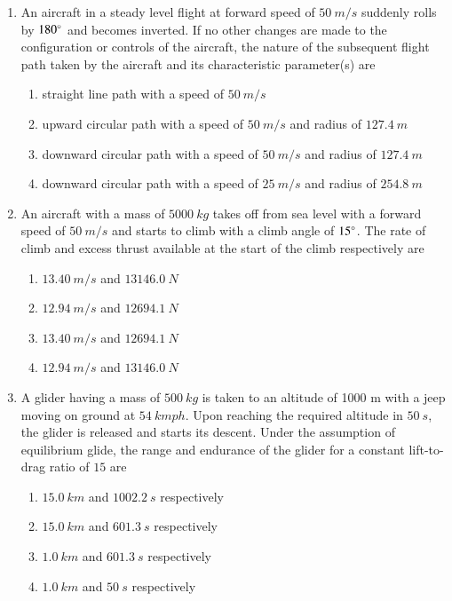 \documentclass{article}
\begin{document}
\begin{enumerate}
\item An aircraft in a steady level flight at forward speed of $50\ m/s$ suddenly rolls by $180\degree$ and becomes inverted. If no other changes are made to the configuration or controls of the aircraft, the nature of the subsequent flight path taken by the aircraft and its characteristic parameter(s) are
\begin{enumerate}
\item straight line path with a speed of $50\ m/s$
\item upward circular path with a speed of $50\ m/s$ and radius of $127.4\ m$
\item downward circular path with a speed of $50\ m/s$ and radius of $127.4\ m$
\item downward circular path with a speed of $25\ m/s$ and radius of $254.8\ m$
\end{enumerate}

\item An aircraft with a mass of $5000\ kg$ takes off from sea level with a forward speed of $50\ m/s$ and starts to climb with a climb angle of $15\degree$. The rate of climb and excess thrust available at the start of the climb respectively are
\begin{multicols}{2}
\begin{enumerate}
\item $13.40\ m/s$ and $13146.0\ N$
\item $12.94\ m/s$ and $12694.1\ N$
\item $13.40\ m/s$ and $12694.1\ N$
\item $12.94\ m/s$ and $13146.0\ N$
\end{enumerate}
\end{multicols}

\item A glider having a mass of $500\ kg$ is taken to an altitude of 1000 m with a jeep moving on ground at $54\ kmph$. Upon reaching the required altitude in $50\ s$, the glider is released and starts its descent. Under the assumption of equilibrium glide, the range and endurance of the glider for a constant lift-to-drag ratio of $15$ are
\begin{multicols}{2}
\begin{enumerate}
\item $15.0\ km$ and $1002.2\ s$ respectively
\item $15.0\ km$ and $601.3\ s$ respectively
\item $1.0\ km$ and $601.3\ s$ respectively
\item $1.0\ km$ and $50\ s$ respectively
\end{enumerate}
\end{multicols}


\end{enumerate}
\end{document}
